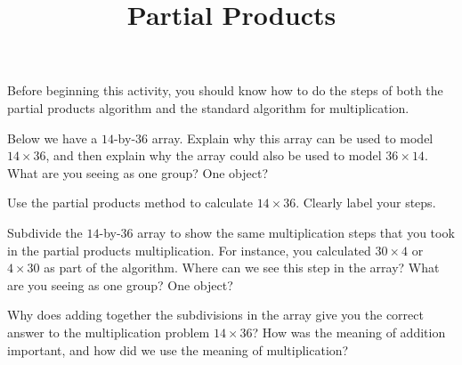 \documentclass[nooutcomes,noauthor]{ximera}
\title{Partial Products}
\begin{document}
\begin{abstract}
\end{abstract}

\maketitle

Before beginning this activity, you should know how to do the steps of both the partial products algorithm and the standard algorithm for multiplication.

\begin{problem}
Below we have a $14$-by-$36$ array. Explain why this array can be used to model $14 \times 36$, and then explain why the array could also be used to model $36 \times 14$. What are you seeing as one group? One object?

\begin{center} \end{center}
\end{problem}


\begin{problem}
Use the partial products method to calculate $14 \times 36$. Clearly label your steps.
\end{problem}


\begin{problem}
Subdivide the $14$-by-$36$ array to show the same multiplication steps that you took in the partial products multiplication. For instance, you calculated $30 \times 4$ or $4 \times 30$ as part of the algorithm. Where can we see this step in the array? What are you seeing as one group? One object?

\begin{center} \end{center}
\end{problem}


\begin{problem}
Why does adding together the subdivisions in the array give you the correct answer to the multiplication problem $14 \times 36$? How was the meaning of addition important, and how did we use the meaning of multiplication?
\end{problem}
\end{document}
